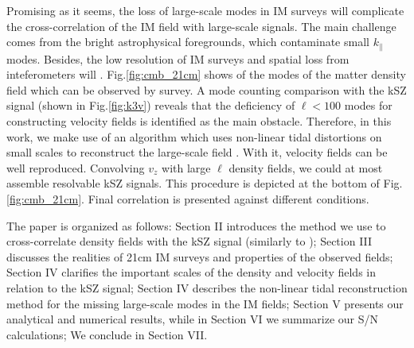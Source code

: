 Promising as it seems, the loss of large-scale modes in IM surveys will complicate the cross-correlation of the IM field with large-scale signals. The main challenge comes from the bright astrophysical foregrounds, which contaminate small $k_\parallel$ modes. Besides, the low resolution of IM surveys  and spatial loss from inteferometers  will . Fig.\ref{fig:cmb_21cm} shows  of the modes of the matter density field which can be observed by  survey.
A mode counting comparison with the kSZ signal (shown in Fig.\ref{fig:k3v}) reveals that the deficiency of $\ell<100$ modes for constructing velocity fields is identified as the main obstacle. 
Therefore, in this work, we make use of an algorithm which uses non-linear tidal distortions on small scales to reconstruct the large-scale field \cite{2012:pen,2015:zhu}. With it, velocity fields can be well reproduced. Convolving $v_z$ with large $\ell$ density fields, we could at most assemble resolvable kSZ signals.  This procedure is depicted at the bottom of Fig. \ref{fig:cmb_21cm}. Final correlation is presented against different conditions. 

The paper is organized as follows: Section II introduces the method we use to cross-correlate density fields with the kSZ signal (similarly to \cite{Shao11}); Section III discusses the realities of 21cm IM surveys and properties of the observed fields; Section IV clarifies the important scales of the density and velocity fields in relation to the kSZ signal; Section IV describes the non-linear tidal reconstruction method for the missing large-scale modes in the IM fields; Section V presents our analytical and numerical results, while in Section VI we summarize our S/N calculations; We conclude in Section VII.

